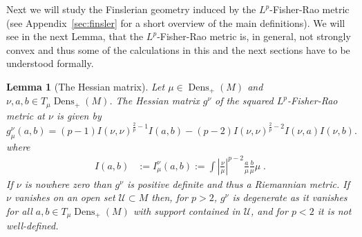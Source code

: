 \documentclass[11pt]{amsart}
\newtheorem{lemma}[theorem]{Lemma}
\theoremstyle{definition}
\newcommand{\Dens}{\operatorname{Dens}_+(M)}
\begin{document}
Next we will study the Finslerian geometry induced by the $L^p$-Fisher-Rao metric (see Appendix~\ref{sec:finsler} for a short overview of the main definitions). We will see in the next Lemma, that the $L^p$-Fisher-Rao metric is, in general, not strongly convex and thus some of the calculations in this and the next sections have to be understood formally.

\begin{lemma}[The Hessian matrix]\label{lem:Hessian}
Let $\mu\in\Dens$ and $\nu,a,b\in T_\mu\Dens$. The Hessian matrix $g^{\nu}$ of the squared $L^p$-Fisher-Rao metric at $\nu$ is given by
    \begin{equation}\label{riem-metric}
        g_\mu^\nu(a,b)=(p-1)I(\nu,\nu)^{\frac{2}{p}-1}I(a,b) - (p-2)I(\nu,\nu)^{\frac{2}{p}-2}I(\nu,a)I(\nu, b).
    \end{equation}
    where
    \begin{equation}
    \begin{aligned}
        I(a,b)&:=I_\mu^\nu(a,b):=\int \left|\frac{\nu}{\mu}\right|^{p-2}\frac{a}{\mu}\frac{b}{\mu}\mu\;.
    \end{aligned}   
    \end{equation}
If $\nu$ is nowhere zero  than  $g^\nu$ is positive definite and thus a Riemannian metric. If $\nu$ vanishes on an open set $\mathcal U\subset M$ then, for $p>2$, $g^\nu$ is degenerate as it vanishes for all $a,b\in T_\mu\Dens$ with support contained in $\mathcal U$, and for $p<2$ it is not well-defined.
\end{lemma}
\end{document}
